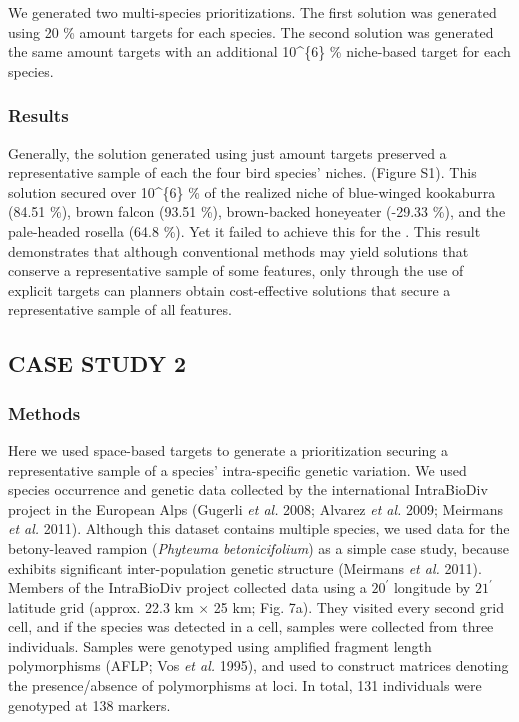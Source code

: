 We generated two multi-species prioritizations. The first solution was
generated using 20 \% amount targets for each species. The second
solution was generated the same amount targets with an additional
10\^{}\{6\} \% niche-based target for each species.

\subsubsection{Results}\label{results}

Generally, the solution generated using just amount targets preserved a
representative sample of each the four bird species' niches. (Figure
S1). This solution secured over 10\^{}\{6\} \% of the realized niche of
blue-winged kookaburra (84.51 \%), brown falcon (93.51 \%), brown-backed
honeyeater (-29.33 \%), and the pale-headed rosella (64.8 \%). Yet it
failed to achieve this for the . This result demonstrates that although
conventional methods may yield solutions that conserve a representative
sample of some features, only through the use of explicit targets can
planners obtain cost-effective solutions that secure a representative
sample of all features.

\subsection{CASE STUDY 2}\label{case-study-2}

\subsubsection{Methods}\label{methods-3}

Here we used space-based targets to generate a prioritization securing a
representative sample of a species' intra-specific genetic variation. We
used species occurrence and genetic data collected by the international
IntraBioDiv project in the European Alps (Gugerli \emph{et al.} 2008;
Alvarez \emph{et al.} 2009; Meirmans \emph{et al.} 2011). Although this
dataset contains multiple species, we used data for the betony-leaved
rampion (\textit{Phyteuma betonicifolium}) as a simple case study,
because exhibits significant inter-population genetic structure
(Meirmans \emph{et al.} 2011). Members of the IntraBioDiv project
collected data using a \(20^{\prime}\) longitude by \(21^{\prime}\)
latitude grid (approx. 22.3 km \(\times\) 25 km; Fig. 7a). They visited
every second grid cell, and if the species was detected in a cell,
samples were collected from three individuals. Samples were genotyped
using amplified fragment length polymorphisms (AFLP; Vos \emph{et al.}
1995), and used to construct matrices denoting the presence/absence of
polymorphisms at loci. In total, 131 individuals were genotyped at 138
markers.

